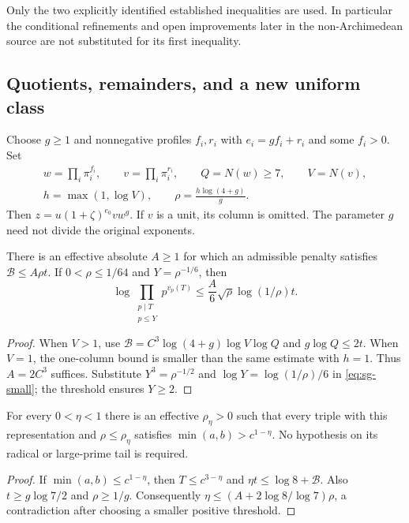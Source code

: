 Only the two explicitly identified established inequalities are used. In
particular the conditional refinements and open improvements later in the
non-Archimedean source are not substituted for its first inequality.

\subsection{Quotients, remainders, and a new uniform class}
Choose $g\ge1$ and nonnegative profiles $f_i,r_i$ with
$e_i=gf_i+r_i$ and some $f_i>0$. Set
\[
\begin{gathered}
 w=\prod_i\pi_i^{f_i},\qquad v=\prod_i\pi_i^{r_i},\qquad
 Q=N(w)\ge7,\qquad V=N(v),\\
 h=\max(1,\log V),\qquad \rho=\frac{h\log(4+g)}g.
\end{gathered}
\]
Then $z=u(1+\zeta)^{e_0}vw^g$. If $v$ is a unit, its column is omitted.
The parameter $g$ need not divide the original exponents.

\begin{corollary}\label{cor:sg-rho}
There is an effective absolute $A\ge1$ for which an admissible penalty satisfies
$\mathcal B\le A\rho t$. If $0<\rho\le1/64$ and $Y=\rho^{-1/6}$, then
\[
 \log\prod_{\substack{p\mid T\\p\le Y}}p^{v_p(T)}
 \le\frac A6\sqrt\rho\log(1/\rho)t.
\]
\end{corollary}
\begin{proof}
When $V>1$, use
$\mathcal B=C^3\log(4+g)\log V\log Q$ and $g\log Q\le2t$.
When $V=1$, the one-column bound is smaller than the same estimate with
$h=1$. Thus $A=2C^3$ suffices. Substitute
$Y^3=\rho^{-1/2}$ and $\log Y=\log(1/\rho)/6$ in
\eqref{eq:sg-small}; the threshold ensures $Y\ge2$.
\end{proof}

\begin{theorem}\label{thm:sg-balance}
For every $0<\eta<1$ there is an effective $\rho_\eta>0$ such that every
triple with this representation and $\rho\le\rho_\eta$ satisfies
$\min(a,b)>c^{1-\eta}$. No hypothesis on its radical or large-prime tail is
required.
\end{theorem}
\begin{proof}
If $\min(a,b)\le c^{1-\eta}$, then $T\le c^{3-\eta}$ and
$\eta t\le\log8+\mathcal B$. Also $t\ge g\log7/2$ and $\rho\ge1/g$.
Consequently
$\eta\le(A+2\log8/\log7)\rho$, a contradiction after choosing a smaller
positive threshold.
\end{proof}

